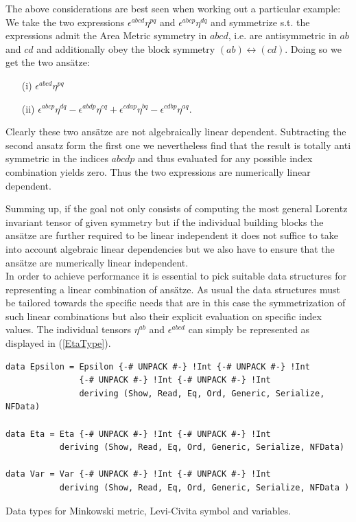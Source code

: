 \documentclass[a4paper,12pt, DIV=14, BCOR=5mm, twoside, headsepline, numbers=noenddot]{scrbook}
\begin{document}
The above considerations are best seen when working out a particular example: We take the two expressions $\epsilon^{abcd} \eta^{pq}$ and $\epsilon^{abcp} \eta^{dq}$ and symmetrize s.t. the expressions admit the Area Metric symmetry in $abcd$, i.e. are antisymmetric in $ab$ and $cd$ and additionally obey the block symmetry $(ab) \leftrightarrow (cd)$. Doing so we get the two ansätze: 
\begin{itemize}
\item[(i)] $\epsilon^{abcd} \eta^{pq}$ 
\item[(ii)] $\epsilon^{abcp} \eta^{dq} - \epsilon^{abdp} \eta^{cq} + \epsilon^{cdap} \eta^{bq} - \epsilon^{cdbp} \eta^{aq}$.
\end{itemize}
Clearly these two ansätze are not algebraically linear dependent. Subtracting the second ansatz form the first one we nevertheless find that the result is totally anti symmetric in the indices $abcdp$ and thus evaluated for any possible index combination yields zero. Thus the two expressions are numerically linear dependent.

Summing up, if the goal not only consists of computing the most general Lorentz invariant tensor of given symmetry but if the individual building blocks the ansätze are further required to be linear independent it does not suffice to take into account algebraic linear dependencies but we also have to ensure that the ansätze are numerically linear independent.  \\

In order to achieve performance it is essential to pick suitable data structures for representing a linear combination of ansätze. As usual the data structures must be tailored towards the specific needs that are in this case the symmetrization of such linear combinations but also their explicit evaluation on specific index values.  
The individual tensors $\eta^{ab}$ and $\epsilon^{abcd}$ can simply be represented as displayed in (\ref{EtaType}).

\begin{listing}[hbt!] 
\begin{verbatim}
data Epsilon = Epsilon {-# UNPACK #-} !Int {-# UNPACK #-} !Int
               {-# UNPACK #-} !Int {-# UNPACK #-} !Int
               deriving (Show, Read, Eq, Ord, Generic, Serialize, NFData)

data Eta = Eta {-# UNPACK #-} !Int {-# UNPACK #-} !Int 
           deriving (Show, Read, Eq, Ord, Generic, Serialize, NFData)

data Var = Var {-# UNPACK #-} !Int {-# UNPACK #-} !Int 
           deriving (Show, Read, Eq, Ord, Generic, Serialize, NFData )
\end{verbatim} 
\caption{Data types for Minkowski metric, Levi-Civita symbol and variables.}\label{EtaType}
\end{listing}
\end{document}
